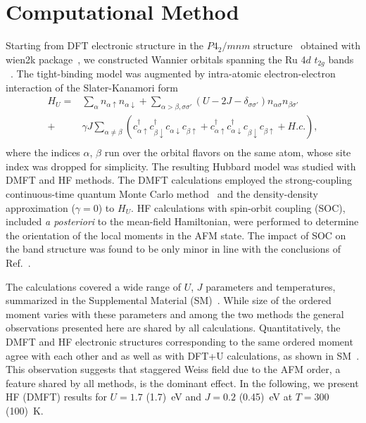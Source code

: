 \documentclass[reprint,twocolumn,superscriptaddress,secnumarabic,amssymb, nobibnotes, aps, prb]{revtex4-1}
\begin{document}
\section{Computational Method}
Starting from DFT electronic structure in the $P4_{2}/mnm$ structure~\cite{Berlijn2017} obtained with {\sc wien2k} package~\cite{wien2k}, 
we constructed Wannier orbitals spanning the Ru 4$d$ $t_{2g}$ bands
~\cite{wien2wannier,wannier90}.
The tight-binding model was augmented by intra-atomic electron-electron interaction of the Slater-Kanamori form~\cite{Slater1960,Kanamori1963}
\begin{equation*}
\begin{split}
H_U=&\sum_{\alpha}n_{\alpha\uparrow}n_{\alpha\downarrow}+\sum_{\alpha>\beta,\sigma\sigma'}  
(U-2J-\delta_{\sigma\sigma'})n_{\alpha\sigma}n_{\beta\sigma'}\\
+&\gamma J\sum_{\alpha\neq\beta}
\left(
c^{\dagger}_{\alpha\uparrow}c^{\dagger}_{\beta\downarrow}
c^{\phantom\dagger}_{\alpha\downarrow}c^{\phantom\dagger}_{\beta\uparrow}+
c^{\dagger}_{\alpha\uparrow}c^{\dagger}_{\alpha\downarrow}
c^{\phantom\dagger}_{\beta\downarrow}c^{\phantom\dagger}_{\beta\uparrow}+H.c.\right),
\\
\end{split}
\end{equation*}
where the indices $\alpha$, $\beta$ run over the orbital flavors on the same atom, whose
site index was dropped for simplicity. The resulting Hubbard model was studied with DMFT and HF methods. 
The DMFT calculations employed the strong-coupling continuous-time quantum Monte Carlo method~\cite{Werner2006a,Boehnke2011,Hafermann12,Hariki2015} and the density-density approximation ($\gamma=0 $) to $H_U$. HF calculations with spin-orbit coupling (SOC), included {\it a posteriori}
to the mean-field Hamiltonian, were performed to determine the orientation of the local moments
in the AFM state. The impact of SOC on the band structure was found to be only minor in line
with the conclusions of Ref.~.

The calculations covered a wide range of $U$, $J$ 
parameters and temperatures, summarized in the Supplemental Material (SM)~\cite{SM}. While size of the ordered moment varies with these parameters and among the two methods the general observations presented here are shared by all calculations. Quantitatively, the DMFT and HF electronic structures 
corresponding to the same ordered moment agree with each other and as well as with DFT+U calculations, as shown in SM~\cite{SM}. This observation suggests that staggered Weiss field due to the AFM order, a feature shared by all methods, is the dominant effect.
In the following, we present HF (DMFT) results for $U=1.7$ (1.7)~eV and $J=0.2$ (0.45)~eV at $T=300$ (100)~K.
\end{document}
